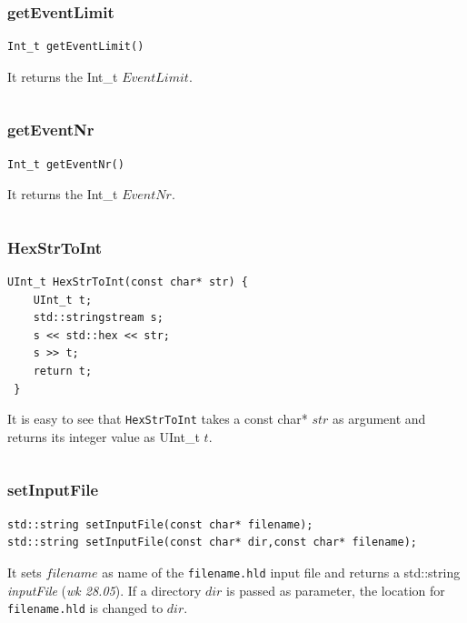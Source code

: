 \documentclass[a4paper]{book}
\begin{document}
\subsubsection{getEventLimit}

\begin{lstlisting}[style=customc]
Int_t getEventLimit()
\end{lstlisting}

It returns the Int\_t $EventLimit$.

\[\]

\subsubsection{getEventNr}

\begin{lstlisting}[style=customc]
Int_t getEventNr()
\end{lstlisting}

It returns the Int\_t $EventNr$.

\[\]

\subsubsection{HexStrToInt}

\begin{lstlisting}[style=customc]
UInt_t HexStrToInt(const char* str) {
	UInt_t t;
	std::stringstream s;
	s << std::hex << str;
	s >> t;
	return t;
 }
\end{lstlisting}

It is easy to see that \texttt{HexStrToInt} takes a const char* $str$ as argument and returns its integer value as UInt\_t $t$.

\[\]

\subsubsection{setInputFile}

\begin{lstlisting}[style=customc]
std::string setInputFile(const char* filename);
std::string setInputFile(const char* dir,const char* filename); 
\end{lstlisting}

It sets $filename$ as name of the \texttt{filename.hld} input file and returns a std::string \textit{inputFile} (\textit{wk 28.05}). If a directory $dir$ is passed as parameter, the location for \texttt{filename.hld} is changed to $dir$.
\end{document}

